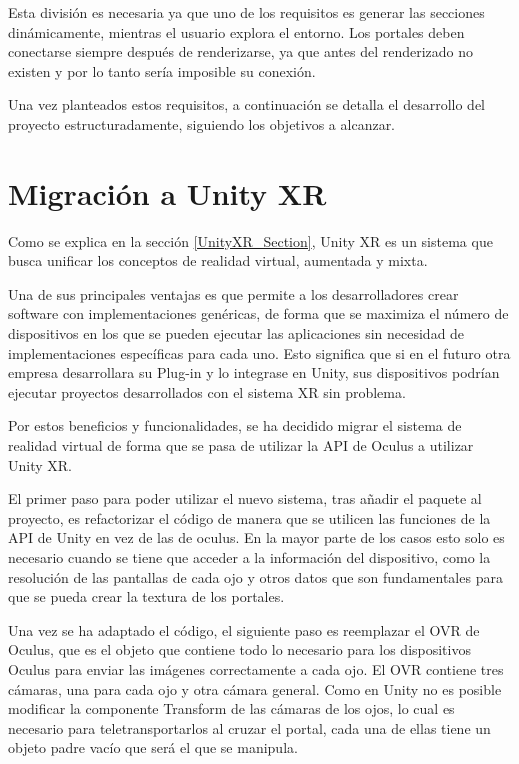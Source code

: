\documentclass[../main.tex]{subfiles}
\begin{document}
Esta división es necesaria ya que uno de los requisitos es generar las secciones dinámicamente, mientras el usuario explora el entorno. Los portales deben conectarse siempre después de renderizarse, ya que antes del renderizado no existen y por lo tanto sería imposible su conexión.

Una vez planteados estos requisitos, a continuación se detalla el desarrollo del proyecto estructuradamente, siguiendo los objetivos a alcanzar.

\section{Migración a Unity XR}

Como se explica en la sección \ref{UnityXR_Section}, Unity XR es un sistema que busca unificar los conceptos de realidad virtual, aumentada y mixta. 

Una de sus principales ventajas es que permite a los desarrolladores crear software con implementaciones genéricas, de forma que se maximiza el número de dispositivos en los que se pueden ejecutar las aplicaciones sin necesidad de implementaciones específicas para cada uno. Esto significa que si en el futuro otra empresa desarrollara su Plug-in y lo integrase en Unity, sus dispositivos podrían ejecutar proyectos desarrollados con el sistema XR sin problema.

Por estos beneficios y funcionalidades, se ha decidido migrar el sistema de realidad virtual de forma que se pasa de utilizar la API de Oculus a utilizar Unity XR.

El primer paso para poder utilizar el nuevo sistema, tras añadir el paquete al proyecto, es refactorizar el código de manera que se utilicen las funciones de la API de Unity en vez de las de oculus. En la mayor parte de los casos esto solo es necesario cuando se tiene que acceder a la información del dispositivo, como la resolución de las pantallas de cada ojo y otros datos que son fundamentales para que se pueda crear la textura de los portales.

Una vez se ha adaptado el código, el siguiente paso es reemplazar el OVR de Oculus, que es el objeto que contiene todo lo necesario para los dispositivos Oculus para enviar las imágenes correctamente a cada ojo. El OVR contiene tres cámaras, una para cada ojo y otra cámara general. Como en Unity no es posible modificar la componente Transform de las cámaras de los ojos, lo cual es necesario para teletransportarlos al cruzar el portal, cada una de ellas tiene un objeto padre vacío que será el que se manipula.
\end{document}
